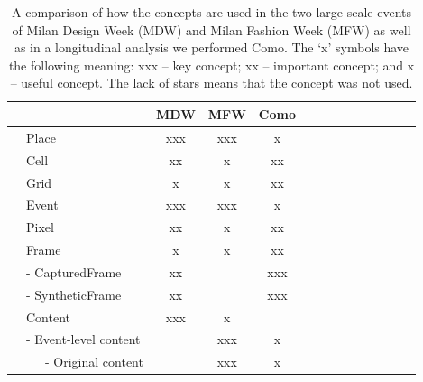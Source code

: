 \begin{table}[t]
\centering
\small
\caption{A comparison of how the \frappe{} concepts are used in the two large-scale events of Milan Design Week (MDW) and Milan Fashion Week (MFW) as well as in a longitudinal analysis we performed Como. The `x' symbols have the following meaning: xxx -- key concept; xx -- important concept; and x -- useful concept. The lack of stars means that the concept was not used.}
\label{tab:frappeAnalysis}
\begin{tabular}{@{}llccccccccclcl@{}}

\toprule
                          &                       & MDW                                      & MFW                 & Como \\ \midrule
\parbox[t]{1mm}{}  & Place                 & xxx               & xxx                &      x              \\
                          & Cell                  & xx                & x                  & xx   \\
                          & Grid                  & x                 & x                  & xx   \\ \midrule
\parbox[t]{1mm}{}  & Event                 & xxx               & xxx                &  x   \\
                          & Pixel                 & xx                & x                  & xx  \\
                          & Frame                 & x                 & x                  & xx  \\
                          & - CapturedFrame       & xx                &                    & xxx \\
                          & - SyntheticFrame    &xx                &                    & xxx  \\ \midrule
\parbox[t]{1mm}{}  & Content   & xxx                 & x                &    \\
                          & - Event-level content   &                  & xxx                &   x   \\
                          & ~~~- Original content    &                  & xxx               &  x    \\

\end{tabular}
\end{table}
